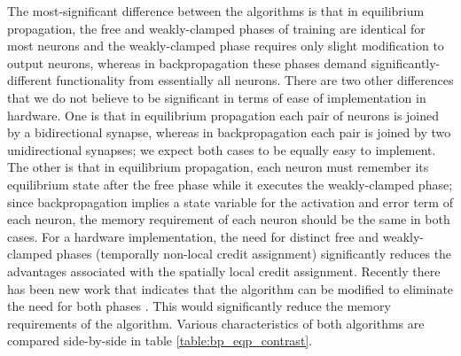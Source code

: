 \documentclass[utf8]{frontiersSCNS}
\begin{document}
\begin{appendices}
The most-significant difference between the algorithms is that in equilibrium propagation, the free
and weakly-clamped phases of training are identical for most neurons and the weakly-clamped phase 
requires only slight modification to output neurons, whereas in backpropagation these phases demand significantly-different functionality from essentially all neurons. There are two other differences that we do not believe to be significant in terms of ease of implementation in hardware. One is that in equilibrium propagation each pair of neurons is joined by a bidirectional synapse, whereas in backpropagation each pair is joined by two unidirectional synapses; we expect both cases to be equally easy to implement. The other is that in equilibrium propagation, each neuron must remember its equilibrium state after the free phase while it executes the weakly-clamped phase; since backpropagation implies a state variable for the activation and error term of each neuron, the memory requirement of each neuron should be the same in both cases.
For a hardware implementation, the need for distinct free and weakly-clamped phases (temporally non-local credit assignment) significantly reduces the advantages associated with the spatially local credit assignment. Recently there has been new work that indicates that the algorithm can be modified to eliminate the need for both phases \citep{ernoult2020}. This would significantly reduce the memory requirements of the algorithm. Various characteristics of both algorithms are compared side-by-side in table \ref{table:bp_eqp_contrast}. 

\end{appendices}

\end{document}
